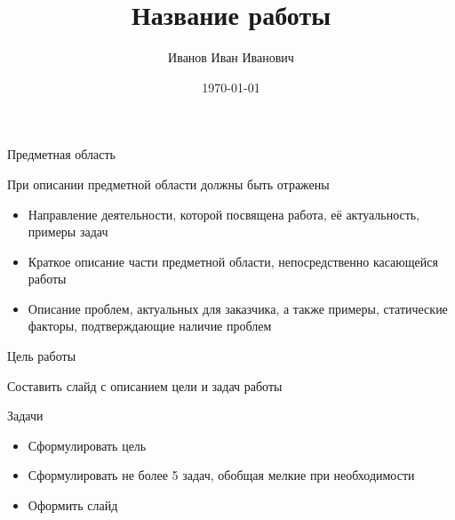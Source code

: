\documentclass{../cls/fefu_presentation}
\author{Иванов Иван Иванович}
\title{Название работы}
\date{\today}
\begin{document}
    
    \presentationtitlepage
    
    
    \begin{frame}{Предметная область}
        \begin{block}{}
            При описании предметной области должны быть отражены
            \begin{itemize}
                \item Направление деятельности, которой посвящена работа, её актуальность, примеры задач
                \item Краткое описание части предметной области, непосредственно касающейся работы
                \item Описание проблем, актуальных для заказчика, а также примеры, статические факторы, подтверждающие наличие проблем
            \end{itemize}
        \end{block}
    \end{frame}

    \note{}
    
    \begin{frame}{Цель работы}
        \begin{block}{}
            Составить слайд с описанием цели и задач работы
        \end{block}
        \begin{block}{Задачи}
            \begin{itemize}
                \item Сформулировать цель
                \item Сформулировать не более 5 задач, обобщая мелкие при необходимости
                \item Оформить слайд
            \end{itemize}
        \end{block}
    \end{frame}

    \note{}
    
\end{document}
